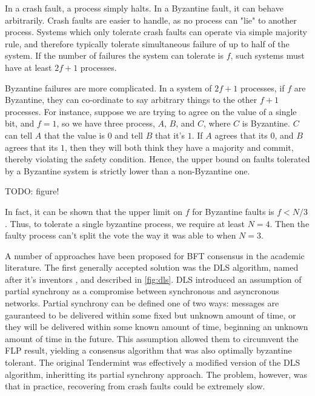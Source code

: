 In a crash fault, a process simply halts. In a Byzantine fault, it can behave arbitrarily.
Crash faults are easier to handle, as no process can "lie" to another process.
Systems which only tolerate crash faults can operate via simple majority rule, 
and therefore typically tolerate simultaneous failure of up to half of the system.
If the number of failures the system can tolerate is $f$, such systems must have at least $2f+1$ processes.

Byzantine failures are more complicated. In a system of $2f+1$ processes, if $f$ are Byzantine, 
they can co-ordinate to say arbitrary things to the other $f+1$ processes.
For instance, suppose we are trying to agree on the value of a single bit, 
and $f=1$, so we have three process, $A$, $B$, and $C$, where $C$ is Byzantine.
$C$ can tell $A$ that the value is $0$ and tell $B$ that it's $1$. 
If $A$ agrees that its $0$, and $B$ agrees that its $1$, then they will both think they have a majority and commit, 
thereby violating the safety condition.
Hence, the upper bound on faults tolerated by a Byzantine system is strictly lower than a non-Byzantine one.

TODO: figure!

In fact, it can be shown that the upper limit on $f$ for Byzantine faults is $f < N/3$ \cite{pease1980reaching}.
Thus, to tolerate a single byzantine process, we require at least $N=4$. 
Then the faulty process can't split the vote the way it was able to when $N=3$.

A number of approaches have been proposed for BFT consensus in the academic literature.
The first generally accepted solution was the DLS algorithm, named after it's inventors \cite{dls}, and described in \ref{fig:dls}.
DLS introduced an assumption of partial synchrony as a compromise between synchronous and asyncronous networks.
Partial synchrony can be defined one of two ways: 
messages are gauranteed to be delivered within some fixed but unknown amount of time,
or they will be delivered within some known amount of time, beginning an unknown amount of time in the future.
This assumption allowed them to circumvent the FLP result, yielding a consensus algorithm that was also optimally byzantine tolerant.
The original Tendermint was effectively a modified version of the DLS algorithm, inheritting its partial synchrony approach.
The problem, however, was that in practice, recovering from crash faults could be extremely slow.

